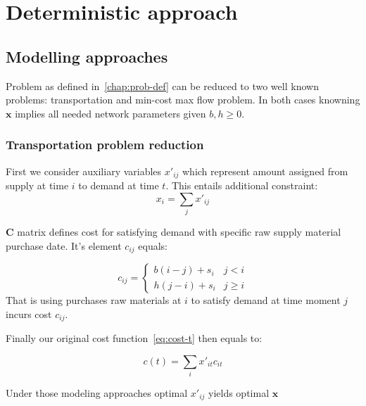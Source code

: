
\chapter{Deterministic approach}
\label{chap:Deterministic approach}

\section{Modelling approaches}

Problem as defined in~\ref{chap:prob-def} can be reduced to two well known problems: transportation and min-cost max flow problem. In both cases knowning $\mathbf{x}$ implies all needed network parameters given $b, h \ge 0$.

\subsection{Transportation problem reduction}
\label{subs:Transportation problem reduction}

First we consider auxiliary variables $x'_{ij}$ which represent amount assigned from supply at time $i$ to demand at time $t$. This entails additional constraint:
\[x_i = \sum_j{x'_{ij}}\]

\begin{definition}{$\mathbf{C}$}
matrix defines cost for satisfying demand with specific raw supply material purchase date. It's element $c_{ij}$ equals:

\begin{equation*}
    c_{ij} = \begin{cases}
        b \left( i - j \right) + s_i & j < i \\
        h \left( j - i \right) + s_i & j \ge i
    \end{cases}
\end{equation*}
That is using purchases raw materials at $i$ to satisfy demand at time moment $j$ incurs cost $c_{ij}$.
\end{definition}

Finally our original cost function~\ref{eq:cost-t} then equals to:

\begin{equation}
    \label{eq:cost-trans-t}
    c(t) = \sum_i{x'_{it}c_{it}}
\end{equation}

Under those modeling approaches optimal $x'_{ij}$ yields optimal $\mathbf{x}$

